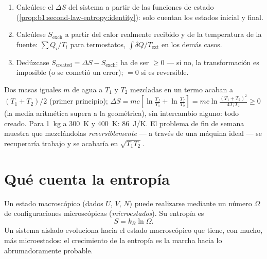 \begin{method}\label{met:b1:second-law-entropy:method}
\begin{enumerate}
  \item Calcúlese el $\Delta S$ del sistema a partir de las funciones de
        estado (\cref{prop:b1:second-law-entropy:identity}): solo cuentan
        los estados inicial y final.
  \item Calcúlese $S_{\mathrm{exch}}$ a partir del calor realmente recibido y
        de la temperatura de la fuente: $\sum Q_i/T_i$ para termostatos,
        $\int\delta Q/T_{\mathrm{ext}}$ en los demás casos.
  \item Dedúzcase $S_{\mathrm{created}} = \Delta S - S_{\mathrm{exch}}$; ha de ser
        $\geq 0$ --- si no, la transformación es imposible (o se cometió un
        error); $= 0$ si es reversible.
\end{enumerate}
\end{method}

\begin{example}\label{ex:b1:second-law-entropy:mixing}
Dos masas iguales $m$ de agua a $T_1$ y $T_2$ mezcladas en un termo acaban a
$(T_1 + T_2)/2$ (primer principio); $\Delta S = mc[\ln\frac{T_f}{T_1} + \ln\frac{T_f}{T_2}]
= mc\ln\frac{(T_1 + T_2)^2}{4T_1T_2} \geq 0$ (la media aritmética supera a la
geométrica), sin intercambio alguno: todo creado. Para \qty{1}{kg} a \qty{300}{K} y
\qty{400}{K}: \qty{86}{J/K}. El problema de fin de semana muestra que
mezclándolas \emph{reversiblemente} --- a través de una máquina ideal ---
se recuperaría trabajo y se acabaría en $\sqrt{T_1T_2}$.
\end{example}

\section{Qué cuenta la entropía}

\begin{proposition}\label{prop:b1:second-law-entropy:boltzmann}
Un estado macroscópico (dados $U$, $V$, $N$) puede realizarse mediante un
número $\Omega$ de configuraciones microscópicas (\emph{microestados}). Su entropía es
\[
S = k_B\ln\Omega .
\]
Un sistema aislado evoluciona hacia el estado macroscópico que tiene, con
mucho, más microestados: el crecimiento de la entropía es la marcha hacia
lo abrumadoramente probable.
\end{proposition}
\admitted

